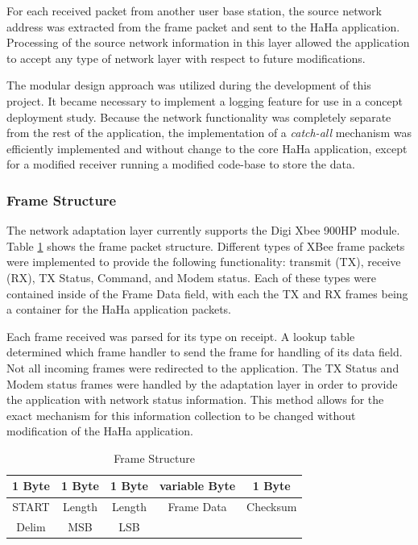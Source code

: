 \documentclass[journal,compsoc]{IEEEtran}
\begin{document}
For each received packet from another user base station, the source network address was extracted from the frame packet and sent to the HaHa application. Processing of the source network information in this layer allowed the application to accept any type of network layer with respect to future modifications.

The modular design approach was utilized during the development of this project. It became necessary to implement a logging feature for use in a concept deployment study. Because the network functionality was completely separate from the rest of the application, the implementation of a {\it catch-all} mechanism was efficiently implemented and without change to the core HaHa application, except for a modified receiver running a modified code-base to store the data.

\subsubsection{Frame Structure}

The network adaptation layer currently supports the Digi Xbee 900HP module. Table \ref{digiframe} shows the frame packet structure. Different types of XBee frame packets were implemented to provide the following functionality: transmit (TX), receive (RX), TX Status, Command, and Modem status. Each of these types were contained inside of the Frame Data field, with each the TX and RX frames being a container for the HaHa application packets.

Each frame received was parsed for its type on receipt. A lookup table determined which frame handler to send the frame for handling of its data field. Not all incoming frames were redirected to the application. The TX Status and Modem status frames were handled by the adaptation layer in order to provide the application with network status information. This method allows for the exact mechanism for this information collection to be changed without modification of the HaHa application.

\begin{table}[]
\centering
\begin{tabular}{ccccc}
\hline
\multicolumn{1}{|c|}{1 Byte} & \multicolumn{1}{c|}{1 Byte} & \multicolumn{1}{c|}{1 Byte} & \multicolumn{1}{c|}{variable Byte} & \multicolumn{1}{c|}{1 Byte} \\ \hline
        START  &  Length &    Length     &    Frame Data    &  Checksum  \\
        Delim  & MSB     &      LSB      &                  &            \\
\end{tabular}
\caption{Frame Structure}
\label{digiframe}
\end{table}
\end{document}
